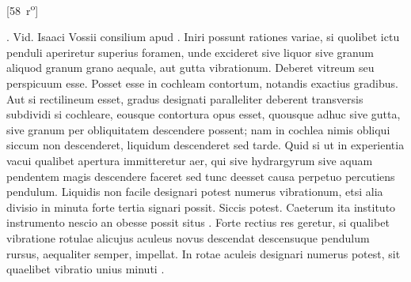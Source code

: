                 \vspace*{8mm}
               \pstart 
                \normalsize
           \begin{center}[58~r\textsuperscript{o}]  \end{center} \pend 
            \pstart {}. Vid. Isaaci Vossii\protect{} consilium apud .\protect{} Iniri possunt rationes variae, si quolibet ictu  penduli aperiretur superius foramen, unde excideret  sive liquor sive granum aliquod granum grano aequale, aut gutta vibrationum. Deberet vitreum seu perspicuum esse.  Posset esse in cochleam\protect{} contortum, notandis exactius  gradibus. Aut si rectilineum esset, gradus designati  paralleliter deberent transversis subdividi  si cochleare, eousque contortura opus esset, quousque  adhuc sive gutta, sive granum per obliquitatem  descendere possent; nam in cochlea\protect{} nimis obliqui  siccum non descenderet, liquidum descenderet sed  tarde. Quid si ut in experientia vacui\protect{} qualibet  apertura immitteretur aer, qui sive hydrargyrum\protect{}  sive aquam pendentem magis descendere faceret  sed tunc deesset causa perpetuo percutiens pendulum\protect{}. Liquidis non facile designari potest  numerus vibrationum, etsi alia divisio in minuta  forte tertia signari possit. Siccis potest. Caeterum  ita instituto instrumento nescio an obesse possit  situs . Forte  rectius res geretur, si qualibet vibratione rotulae  alicujus aculeus novus descendat descensuque pendulum\protect{}  rursus, aequaliter semper, impellat. In rotae aculeis  designari numerus potest, sit   quaelibet vibratio unius minuti . 
